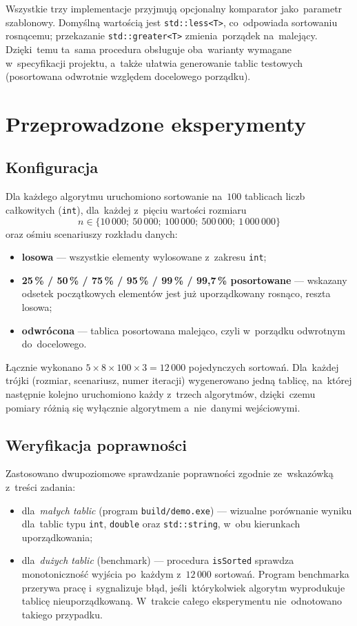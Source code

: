 \documentclass[11pt,a4paper]{article}
\begin{document}
Wszystkie trzy implementacje przyjmują opcjonalny komparator jako~parametr szablonowy. Domyślną
wartością jest \texttt{std::less<T>}, co~odpowiada sortowaniu rosnącemu; przekazanie
\texttt{std::greater<T>} zmienia~porządek na~malejący. Dzięki~temu ta~sama procedura obsługuje
oba~warianty wymagane w~specyfikacji projektu, a~także ułatwia generowanie tablic testowych
(posortowana odwrotnie względem docelowego porządku).

\section{Przeprowadzone eksperymenty}

\subsection{Konfiguracja}

Dla każdego algorytmu uruchomiono sortowanie na~$100$ tablicach liczb całkowitych (\texttt{int}),
dla~każdej z~pięciu wartości rozmiaru
\[
n \in \{10\,000;\ 50\,000;\ 100\,000;\ 500\,000;\ 1\,000\,000\}
\]
oraz ośmiu scenariuszy rozkładu danych:

\begin{itemize}[nosep]
  \item \textbf{losowa} --- wszystkie elementy wylosowane z~zakresu \texttt{int};
  \item \textbf{25\,\% / 50\,\% / 75\,\% / 95\,\% / 99\,\% / 99,7\,\% posortowane} --- wskazany
  odsetek początkowych elementów jest już uporządkowany rosnąco, reszta losowa;
  \item \textbf{odwrócona} --- tablica posortowana malejąco, czyli w~porządku odwrotnym
  do~docelowego.
\end{itemize}

Łącznie wykonano $5 \times 8 \times 100 \times 3 = 12\,000$ pojedynczych sortowań.
Dla~każdej trójki (rozmiar, scenariusz, numer iteracji) wygenerowano jedną tablicę,
na~której następnie kolejno uruchomiono każdy z~trzech algorytmów, dzięki~czemu pomiary różnią się
wyłącznie algorytmem a~nie~danymi wejściowymi.

\subsection{Weryfikacja poprawności}

Zastosowano dwupoziomowe sprawdzanie poprawności zgodnie ze~wskazówką z~treści zadania:
\begin{itemize}[nosep]
  \item dla~\emph{małych tablic} (program \texttt{build/demo.exe}) --- wizualne porównanie wyniku
  dla~tablic typu \texttt{int}, \texttt{double} oraz \texttt{std::string}, w~obu kierunkach
  uporządkowania;
  \item dla~\emph{dużych tablic} (benchmark) --- procedura \texttt{isSorted} sprawdza monotoniczność
  wyjścia po~każdym z~$12\,000$ sortowań. Program benchmarka przerywa pracę i~sygnalizuje błąd,
  jeśli~którykolwiek algorytm wyprodukuje tablicę nieuporządkowaną. W~trakcie całego eksperymentu
  nie~odnotowano takiego przypadku.
\end{itemize}
\end{document}
